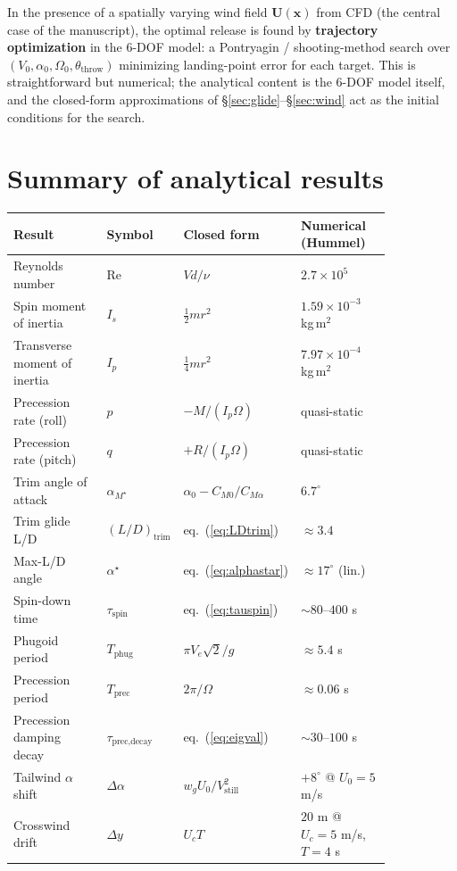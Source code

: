 \documentclass[11pt,letterpaper]{article}
\begin{document}
In the presence of a spatially varying wind field $\mathbf{U}(\mathbf{x})$ from CFD (the central case of the manuscript), the optimal release is found by \textbf{trajectory optimization} in the 6-DOF model: a Pontryagin / shooting-method search over $(V_0, \alpha_0, \Omega_0, \theta_{\text{throw}})$ minimizing landing-point error for each target. This is straightforward but numerical; the analytical content is the 6-DOF model itself, and the closed-form approximations of \S\ref{sec:glide}--\S\ref{sec:wind} act as the initial conditions for the search.

\section{Summary of analytical results}

\begin{center}
\small
\begin{tabular}{@{}p{0.30\linewidth} l p{0.27\linewidth} p{0.27\linewidth}@{}}
\toprule
\textbf{Result} & \textbf{Symbol} & \textbf{Closed form} & \textbf{Numerical (Hummel)} \\
\midrule
Reynolds number & Re & $V d/\nu$ & $2.7\times10^5$ \\
Spin moment of inertia & $I_s$ & $\tfrac{1}{2}m r^2$ & $1.59\times10^{-3}$ kg\,m$^2$ \\
Transverse moment of inertia & $I_p$ & $\tfrac{1}{4}m r^2$ & $7.97\times10^{-4}$ kg\,m$^2$ \\
Precession rate (roll) & $p$ & $-M/(I_p\Omega)$ & quasi-static \\
Precession rate (pitch) & $q$ & $+R/(I_p\Omega)$ & quasi-static \\
Trim angle of attack & $\alpha_{M^\star}$ & $\alpha_0 - C_{M0}/C_{M\alpha}$ & $6.7^\circ$ \\
Trim glide L/D & $(L/D)_{\text{trim}}$ & eq.\ (\ref{eq:LDtrim}) & $\approx 3.4$ \\
Max-L/D angle & $\alpha^\star$ & eq.\ (\ref{eq:alphastar}) & $\approx 17^\circ$ (lin.) \\
Spin-down time & $\tau_{\text{spin}}$ & eq.\ (\ref{eq:tauspin}) & $\sim 80$--$400$ s \\
Phugoid period & $T_{\text{phug}}$ & $\pi V_e\sqrt{2}/g$ & $\approx 5.4$ s \\
Precession period & $T_{\text{prec}}$ & $2\pi/\Omega$ & $\approx 0.06$ s \\
Precession damping decay & $\tau_{\text{prec,decay}}$ & eq.\ (\ref{eq:eigval}) & $\sim 30$--$100$ s \\
Tailwind $\alpha$ shift & $\Delta\alpha$ & $w_g U_0/V_{\text{still}}^2$ & $+8^\circ$ @ $U_0=5$ m/s \\
Crosswind drift & $\Delta y$ & $U_c T$ & $20$ m @ $U_c=5$ m/s, $T=4$ s \\
\bottomrule
\end{tabular}
\end{center}
\end{document}
